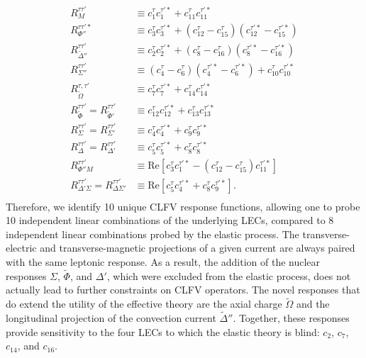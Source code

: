 \documentclass{book}[letterpaper,12pt]
\begin{document}
\begin{equation}
\begin{split}
R_M^{\tau\tau'}&\equiv c_1^{\tau}c_1^{\tau'*}+c_{11}^{\tau}c_{11}^{\tau'*}\\
R_{\Phi''}^{\tau\tau'*}&\equiv c_3^{\tau}c_3^{\tau'*}+(c_{12}^{\tau}-c_{15}^{\tau})(c_{12}^{\tau'*}-c_{15}^{\tau'*})\\
R_{\tilde{\Delta}''}^{\tau\tau'}&\equiv c_2^{\tau}c_2^{\tau'*}+(c_8^{\tau}-c_{16}^{\tau})(c_8^{\tau'*}-c_{16}^{\tau'*})\\
R_{\Sigma''}^{\tau\tau'}&\equiv(c_4^{\tau}-c_6^{\tau})(c_4^{\tau'*}-c_6^{\tau'*})+c_{10}^{\tau}c_{10}^{\tau'*}\\
R_{\tilde{\Omega}}^{\tau,\tau'}&\equiv c_7^{\tau}c_7^{\tau'*}+c_{14}^{\tau}c_{14}^{\tau'*}\\
R_{\tilde{\Phi}}^{\tau\tau'}=R_{\tilde{\Phi}'}^{\tau\tau'}&\equiv c_{12}^{\tau}c_{12}^{\tau'*}+c_{13}^{\tau}c_{13}^{\tau'*}\\
R_{\Sigma}^{\tau\tau'}=R_{\Sigma'}^{\tau\tau'}&\equiv c_4^{\tau}c_4^{\tau'*}+c_9^{\tau}c_9^{\tau'*}\\
R_{\Delta}^{\tau\tau'}=R_{\Delta'}^{\tau\tau'}&\equiv c_5^{\tau}c_5^{\tau'*}+c_8^{\tau}c_8^{\tau'*}\\
R_{\Phi''M}^{\tau\tau'}&\equiv \mathrm{Re}\left[c_3^{\tau}c_1^{\tau'*}-(c_{12}^{\tau}-c_{15}^{\tau})c_{11}^{\tau'*}\right]\\
R_{\Delta'\Sigma}^{\tau\tau'}=R_{\Delta\Sigma'}^{\tau\tau'}&\equiv \mathrm{Re}\left[c_5^{\tau}c_4^{\tau'*}+c_8^{\tau}c_9^{\tau'*}\right].\\
\end{split}
\end{equation}
Therefore, we identify 10 unique CLFV response functions, allowing one to probe 10 independent linear combinations of the underlying LECs, compared to 8 independent linear combinations probed by the elastic process. The transverse-electric and transverse-magnetic projections of a given current are always paired with the same leptonic response. As a result, the addition of the nuclear responses $\Sigma$, $\tilde{\Phi}$, and $\Delta'$, which were excluded from the elastic process, does not actually lead to further constraints on CLFV operators. The novel responses that do extend the utility of the effective theory are the axial charge $\tilde{\Omega}$ and the longitudinal projection of the convection current $\tilde{\Delta}''$. Together, these responses provide sensitivity to the four LECs to which the elastic theory is blind: $c_2$, $c_7$, $c_{14}$, and $c_{16}$.
\end{document}
